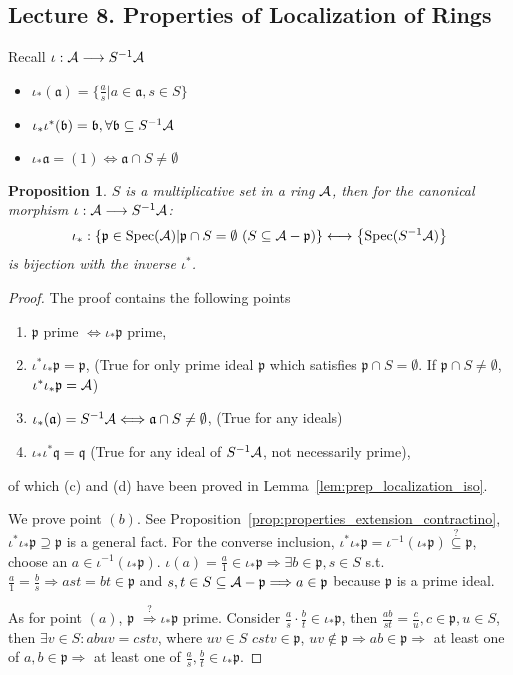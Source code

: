 \documentclass[11pt]{article}
\newtheorem{prop}[thm]{Proposition}
\newcommand{\sca}{{\mathfrak a}}
\newcommand{\scb}{{\mathfrak b}}
\newcommand{\scp}{{\mathfrak p}}
\newcommand{\scq}{\mathfrak q}
\newcommand{\cala}{{\cal A}}
\newcommand{\Lrta}{\Longrightarrow}
\newcommand{\lrta}{\longrightarrow}
\newcommand{\Llrta}{\Longleftrightarrow}
\begin{document}
\subsection{Lecture 8. Properties of Localization of Rings}
Recall
$\iota:\cala\lrta S^{-1}\cala$
\begin{itemize}
\item $\iota_*(\sca)=\{\frac{a}{s}|a\in \sca,s\in S\}$
\item $\iota_*\iota^*(\scb)=\scb,\forall \scb\subseteq S^{-1}\cala$
\item $\iota_*\sca=(1)\Llrta \sca\cap S\neq \emptyset$
\end{itemize}
\begin{prop}\label{prop:iso_spec_localization}
$S$ is a multiplicative set in a ring $\cala$, then for the canonical morphism $\iota:\cala\lrta S^{-1}\cala$:
$$
\iota_*:\left\{\scp\in \text{Spec}(\cala)|\scp\cap S=\emptyset\ (S\subseteq \cala-\scp)\right\}\longleftrightarrow \left\{\text{Spec}(S^{-1}\cala)\right\}
$$
is bijection with the inverse $\iota^*$.
\end{prop}
\begin{proof}
The proof contains the following points
\begin{enumerate}[label=(\alph*)]
\item $\scp$ prime $\Llrta \iota_*\scp$ prime,
\item $\iota^*\iota_*\scp=\scp$, (True for only prime ideal $\scp$ which satisfies $\scp\cap S=\emptyset$. If $\scp\cap S\neq \emptyset$, $\iota^*\iota_*\scp=\cala$)
\item $\iota_*(\sca)= S^{-1}\cala\Llrta\sca\cap S\neq \emptyset$, (True for any ideals)
\item  $\iota_*\iota^*\scq=\scq$ (True for any ideal of $S^{-1}\cala$, not necessarily prime),
\end{enumerate}
of which (c) and (d) have  been proved in Lemma~\ref{lem:prep_localization_iso}.

We prove point $(b)$.
See Proposition~\ref{prop:properties_extension_contractino}, $\iota^*\iota_*\scp\supseteq\scp$ is a general fact.
 For the converse inclusion, $\iota^*\iota_*\scp=\iota^{-1}(\iota_*\scp)\overset{?}{\subseteq}\scp$, choose an $a\in \iota^{-1}(\iota_*\scp)$. $\iota(a)=\frac{a}{1}\in\iota_*\scp\Lrta\exists b\in \scp, s\in S$ s.t. $\frac{a}{1}=\frac{b}{s}\Lrta ast=bt\in \scp$ and $s,t \in S\subseteq \cala-\scp\Lrta a\in \scp$ because $\scp$ is a prime ideal.

As for point $(a)$, $\scp$  $\overset{?}{\Lrta}\iota_*\scp$ prime. Consider $\frac{a}{s}\cdot \frac{b}{t}\in \iota_*\scp$, then $\frac{ab}{st}=\frac{c}{u},c\in\scp, u\in S$, then $\exists v\in S:abuv=cstv$, where $uv\in S$ $cstv\in\scp$, $uv\not\in \scp\Lrta ab\in\scp\Lrta$ at least one of $a, b\in\scp\Lrta$ at least one of $\frac{a}{s},\frac{b}{t}\in \iota_*\scp$.
\end{proof}
\end{document}

